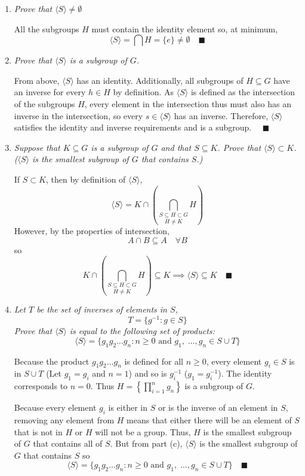 \documentclass[12pt]{article}
\newcommand{\qed}{\quad \blacksquare}
\newcommand{\brak}[1]{\langle #1 \rangle}
\begin{document}
\begin{enumerate}[label=(\alph*)]
    \item \emph{Prove that $\brak{S} \neq \emptyset$}
    
    \color{blue}
        All the subgroups $H$ must contain the identity element so, at minimum,
        \[\brak{S} = \bigcap H = \{e\} \neq \emptyset \qed\]
    \color{black}
    
    \item \emph{Prove that $\brak{S}$ is a subgroup of $G$. }
    
    \color{blue}
        From above, $\brak{S}$ has an identity. Additionally, all subgroups of $H \subseteq G$ have an inverse for every $h \in H$ by definition. As $\brak{S}$ is defined as the intersection of the subgroups $H$, every element in the intersection thus must also has an inverse in the intersection, so every $s \in \brak{S}$ has an inverse. Therefore, $\brak{S}$ satisfies the identity and inverse requirements and is a subgroup. $\qed$
    \color{black}

    \item \emph{Suppose that $K \subseteq G$ is a subgroup of $G$ and that $S \subseteq K$. Prove that $\brak{S} \subset K$. ($\brak{S}$ is the smallest subgroup of $G$ that contains $S$.)}
    
    \color{blue}
        If $S \subset K$, then by definition of $\brak{S}$, 
        \[\brak{S} = K \cap \left(\underset{H\neq K}{\bigcap_{S \subseteq H \subset G}} H\right)\]
        However, by the properties of intersection, 
        \[A \cap B \subseteq A \quad \forall B\]
        so 
        \[K \cap \left(\underset{H\neq K}{\bigcap_{S \subseteq H \subset G}} H\right) \subseteq K \implies \brak{S} \subseteq K \qed\]
    \color{black}

    \item \emph{Let $T$ be the set of inverses of elements in $S$, }
    \[T = \{g^{-1} : g \in S\}\]
    \emph{Prove that $\brak{S}$ is equal to the following set of products:}
    \[\brak{S} = \{g_1 g_2 \dots g_n : n \geq 0 \text{ and } g_1, \; \dots, g_n \in S \cup T\}\]

    \color{blue}
        Because the product $g_1 g_2 \dots g_n$ is defined for all $n \geq 0$, every element $g_i \in S$ is in $S \cup T$ (Let $g_1 = g_i$ and $n = 1$) and so is $g_i^{-1}$ ($g_1 = g_i^{-1}$). The identity corresponds to $n=0$. Thus $H = \left\{\prod_{i=1}^n g_n\right\}$ is a subgroup of $G$. 
        
        Because every element $g_i$ is either in $S$ or is the inverse of an element in $S$, removing any element from $H$ means that either there will be an element of $S$ that is not in $H$ or $H$ will not be a group. Thus, $H$ is the smallest subgroup of $G$ that contains all of $S$. But from part (c), $\brak{S}$ is the smallest subgroup of $G$ that contains $S$ so 
       \[\brak{S} = \{g_1 g_2 \dots g_n : n \geq 0 \text{ and } g_1, \; \dots, g_n \in S \cup T\} \qed\]
    \color{black}
\end{enumerate}
\pagebreak
\end{document}
